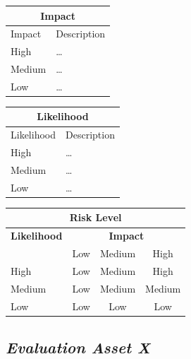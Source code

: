 \documentclass[a4paper, toc=index, 12pt, DIV14, twoside, BCOR2cm, headsepline, numbers=noenddot, bibliography=totoc]{scrbook}
\begin{document}
\begin{center}
\begin{tabular}{|l|l|}
\hline
\multicolumn{2}{|c|}{\bf Impact} \\
\hline
Impact & Description \\
\hline
\hline
High   & \hspace*{20pt}\ldots \\
\hline
Medium & \hspace*{20pt}\ldots \\
\hline
Low   & \hspace*{20pt}\ldots \\
\hline
\end{tabular}
%
%
\begin{tabular}{|l|l|}
\hline
\multicolumn{2}{|c|}{\bf Likelihood} \\
\hline
Likelihood & Description \\
\hline
\hline
High   & \hspace*{20pt}\ldots \\
\hline
Medium & \hspace*{20pt}\ldots \\
\hline
Low   & \hspace*{20pt}\ldots \\
\hline
\end{tabular}
\end{center}

\vspace{5mm}

\begin{center}
\begin{tabular}{|l|c|c|c|}
\hline
\multicolumn{4}{|c|}{{\bf Risk Level}} \\
\hline
{{\bf Likelihood}} & \multicolumn{3}{c|}{{\bf Impact}} \\ %
     & Low & Medium & High \\  \hline
 High & Low & Medium & High  \\
\hline
 Medium & Low & Medium & Medium \\
\hline
 Low & Low & Low & Low \\
\hline
\end{tabular}
\end{center}

\subsection{{\it Evaluation Asset X}}
\end{document}
